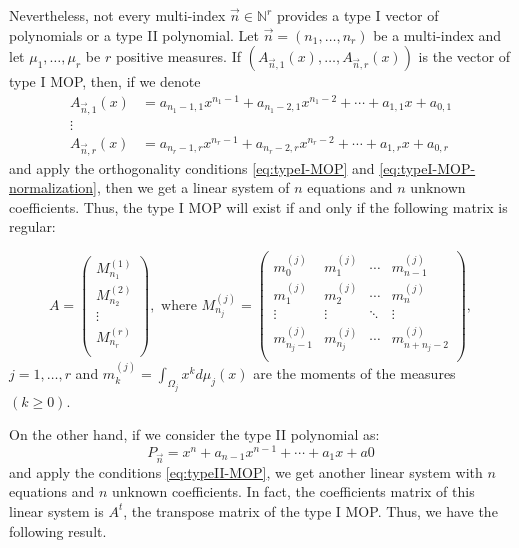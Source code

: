 \documentclass[12pt,a4]{article}
\theoremstyle{plain}
\newcommand{\N}[0]{\mathbb{N}}
\begin{document}
Nevertheless, not every multi-index $\vec n\in\N^r$ provides a type I vector of polynomials or a type II polynomial. Let $\vec n = (n_1,\dots,n_r)$ be a multi-index and let $\mu_1,\dots,\mu_r$ be $r$ positive measures. If $(A_{\vec n, 1}(x), \dots, A_{\vec n, r}(x))$ is the vector of type I MOP, then, if we denote
\begin{equation}
    \begin{split}
        A_{\vec n,1}(x) &= a_{n_1-1,1}x^{n_1-1} + a_{n_1-2,1}x^{n_1-2} + \cdots + a_{1,1}x + a_{0,1} \\
        \vdots & \\
        A_{\vec n,r}(x) &= a_{n_r-1,r}x^{n_r-1} + a_{n_r-2,r}x^{n_r-2} + \cdots + a_{1,r}x + a_{0,r}
    \end{split}
\end{equation}
and apply the orthogonality conditions \eqref{eq:typeI-MOP} and \eqref{eq:typeI-MOP-normalization}, then we get a linear system of $n$ equations and $n$ unknown coefficients. Thus, the type I MOP will exist if and only if the following matrix is regular:

\begin{equation}
    \label{eq:MOP-matrix}
    A=\left(\begin{array}{c}
    M_{n_1}^{(1)} \\ \hline
    M_{n_2}^{(2)} \\ \hline
    \vdots \\ \hline
    M_{n_r}^{(r)} \\ 
\end{array}\right), \text{ \ \  where \ \ } M_{n_j}^{(j)} = \begin{pmatrix}
    m_0^{(j)} & m_1^{(j)} & \cdots & m_{n-1}^{(j)} \\
    m_1^{(j)} & m_2^{(j)} & \cdots & m_{n}^{(j)} \\
    \vdots & \vdots & \ddots & \vdots \\
    m_{n_j-1}^{(j)} & m_{n_j}^{(j)} & \cdots & m_{n+n_j-2}^{(j)} \\
\end{pmatrix},
\end{equation}
$j=1,\dots,r$ and $m_k^{(j)}=\displaystyle\int_{\Omega_j} x^k d\mu_j(x)$ are the moments of the measures $(k\geq 0)$.

On the other hand, if we consider the type II polynomial as:
$$
P_{\vec n} = x^n + a_{n-1} x^{n-1} + \cdots + a_1 x + a0
$$
and apply the conditions \eqref{eq:typeII-MOP}, we get another linear system with $n$ equations and $n$ unknown coefficients. In fact, the coefficients matrix of this linear system is $A^t$, the transpose matrix of the type I MOP. Thus, we have the following result.
\end{document}
